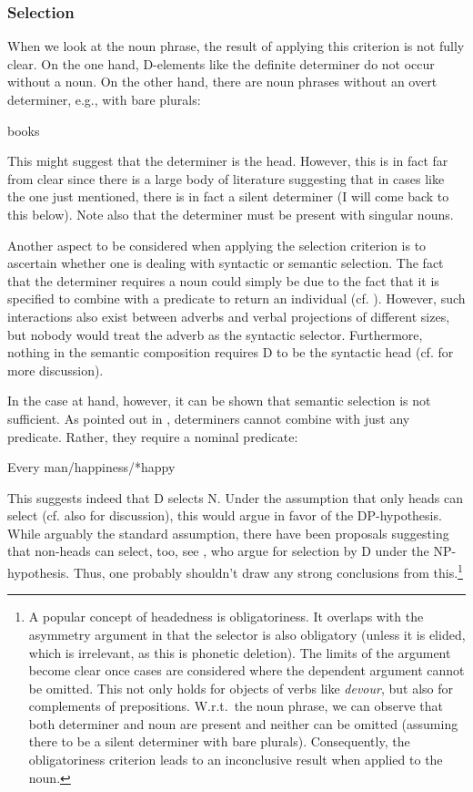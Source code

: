 \documentclass[output=paper,colorlinks,citecolor=black,
]{langscibook}
\begin{document}
\subsubsection{Selection}

When we look at the noun phrase, the result of applying this criterion is not fully clear. On the one hand, D-elements like the definite determiner do not occur without a noun. On the other hand, there are noun phrases without an overt determiner, e.g., with bare plurals:

\ea books
\z

\noindent
This might suggest that the determiner is the head. However, this is in fact far from clear since there is a large body of literature suggesting that in cases like the one just mentioned, there is in fact a silent determiner (I will come back to this below). Note also that the determiner must be present with singular nouns. 

Another aspect to be considered when applying the selection criterion is to ascertain whether one is dealing with syntactic or semantic selection. The fact that the determiner requires a noun could simply be due to the fact that it is specified to combine with a predicate to return an individual (cf. \citealt{Longobardi:1994:Reference-properNames}). However, such interactions also exist between adverbs and verbal projections of different sizes, but nobody would treat the adverb as the syntactic selector. Furthermore, nothing in the semantic composition requires D to be the syntactic head (cf. \citealt[31]{Bruening:2009:DP} for more discussion).

In the case at hand, however, it can be shown that semantic selection is not sufficient. As pointed
out in \citet{Larson:to-appear:DP-hypothesisDP-CP}, determiners cannot combine with just any
predicate. Rather, they require a nominal predicate: 

\ea Every man/happiness/*happy
\z 

\noindent
This suggests indeed that D selects N. Under the assumption that only heads can select (cf. also \citealt{Zwicky:1985:heads} for discussion), this would argue in favor of the DP-hypothesis. While arguably the standard assumption, there have been proposals suggesting that non-heads can select, too, see \citet{Bruening-et-al:2018:Selection-Idioms-NP}, who argue for selection by D under the NP-hypothesis. Thus, one probably shouldn't draw any strong conclusions from this.\footnote{A popular concept of headedness is obligatoriness. It overlaps with the asymmetry argument in that the selector is also obligatory (unless it is elided, which is irrelevant, as this is phonetic deletion). The limits of the argument become clear once cases are considered where the dependent argument cannot be omitted. This not only holds for objects of verbs like \textit{devour}, but also for complements of prepositions. W.r.t.\ the noun phrase, we can observe that both determiner and noun are present and neither can be omitted (assuming there to be a silent determiner with bare plurals). Consequently, the obligatoriness criterion leads to an inconclusive result when applied to the noun.}
\end{document}
